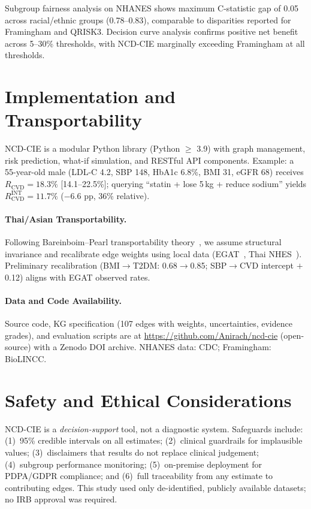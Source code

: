 \documentclass[runningheads]{llncs}
\begin{document}
Subgroup fairness analysis on NHANES shows maximum C-statistic gap of
0.05 across racial/ethnic groups (0.78--0.83), comparable to
disparities reported for Framingham and QRISK3.
Decision curve analysis confirms positive net benefit across
5--30\% thresholds, with NCD-CIE marginally exceeding Framingham
at all thresholds.

\section{Implementation and Transportability}\label{sec:impl}

NCD-CIE is a modular Python library (Python $\geq$ 3.9) with
graph management, risk prediction, what-if simulation, and RESTful
API components.
Example: a 55-year-old male (LDL-C 4.2, SBP 148, HbA1c 6.8\%, BMI
31, eGFR 68) receives $R_{\text{CVD}} = 18.3\%$ [14.1--22.5\%];
querying ``statin + lose 5\,kg + reduce sodium'' yields
$R_{\text{CVD}}^{\text{INT}} = 11.7\%$ ($-$6.6 pp, 36\% relative).

\paragraph{Thai/Asian Transportability.}
Following Bareinboim--Pearl transportability
theory~\cite{bareinboim2016causal}, we assume structural invariance
and recalibrate edge weights using local data
(EGAT~\cite{sritara2003egat}, Thai NHES~\cite{aekplakorn2011thai}).
Preliminary recalibration (BMI$\to$T2DM: 0.68$\to$0.85;
SBP$\to$CVD intercept $+$0.12) aligns with EGAT observed rates.

\paragraph{Data and Code Availability.}
Source code, KG specification (107 edges with weights, uncertainties,
evidence grades), and evaluation scripts are at
\url{https://github.com/Anirach/ncd-cie} (open-source) with a
Zenodo DOI archive.
NHANES data: CDC; Framingham: BioLINCC.

\section{Safety and Ethical Considerations}\label{sec:ethics}

NCD-CIE is a \emph{decision-support} tool, not a diagnostic system.
Safeguards include: (1)~95\% credible intervals on all estimates;
(2)~clinical guardrails for implausible values;
(3)~disclaimers that results do not replace clinical judgement;
(4)~subgroup performance monitoring;
(5)~on-premise deployment for PDPA/GDPR compliance; and
(6)~full traceability from any estimate to contributing edges.
This study used only de-identified, publicly available datasets;
no IRB approval was required.
\end{document}
